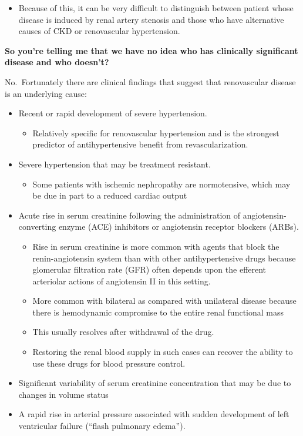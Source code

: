 \documentclass[
]{book}
\providecommand{\tightlist}{%
  \setlength{\itemsep}{0pt}\setlength{\parskip}{0pt}}
\begin{document}
\begin{itemize}
\tightlist
\item
  Because of this, it can be very difficult to distinguish between
  patient whose disease is induced by renal artery stenosis and those
  who have alternative causes of CKD or renovascular hypertension.
\end{itemize}

\textbf{So you're telling me that we have no idea who has clinically
significant disease and who doesn't?}

No.~Fortunately there are clinical findings that suggest that
renovascular disease is an underlying cause:

\begin{itemize}
\item
  Recent or rapid development of severe hypertension.

  \begin{itemize}
  \tightlist
  \item
    Relatively specific for renovascular hypertension and is the
    strongest predictor of antihypertensive benefit from
    revascularization.
  \end{itemize}
\item
  Severe hypertension that may be treatment resistant.

  \begin{itemize}
  \tightlist
  \item
    Some patients with ischemic nephropathy are normotensive, which
    may be due in part to a reduced cardiac output
  \end{itemize}
\item
  Acute rise in serum creatinine following the administration of
  angiotensin-converting enzyme (ACE) inhibitors or angiotensin
  receptor blockers (ARBs).

  \begin{itemize}
  \item
    Rise in serum creatinine is more common with agents that block
    the renin-angiotensin system than with other antihypertensive
    drugs because glomerular filtration rate (GFR) often depends
    upon the efferent arteriolar actions of angiotensin II in this
    setting.
  \item
    More common with bilateral as compared with unilateral disease
    because there is hemodynamic compromise to the entire renal
    functional mass
  \item
    This usually resolves after withdrawal of the drug.
  \item
    Restoring the renal blood supply in such cases can recover the
    ability to use these drugs for blood pressure control.
  \end{itemize}
\item
  Significant variability of serum creatinine concentration that may
  be due to changes in volume status
\item
  A rapid rise in arterial pressure associated with sudden development
  of left ventricular failure (``flash pulmonary edema'').


\end{itemize}
\end{document}

